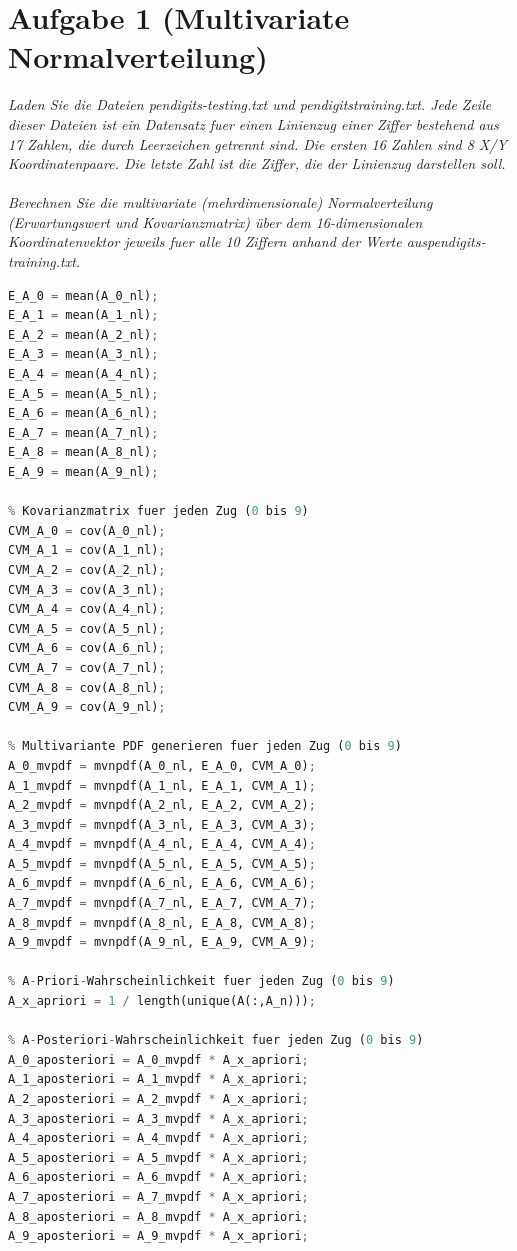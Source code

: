 \documentclass[12pt]{article}
\begin{document}
\section{Aufgabe 1 (Multivariate Normalverteilung)}
\textit{Laden Sie die Dateien pendigits-­testing.txt​ und pendigits­training.txt​. Jede Zeile dieser Dateien ist ein Datensatz fuer einen Linienzug einer Ziffer bestehend aus 17 Zahlen, die durch Leerzeichen getrennt sind. Die ersten 16 Zahlen sind 8 X/Y ­Koordinatenpaare. Die letzte Zahl ist die Ziffer, die der Linienzug darstellen soll.\\
\\
Berechnen Sie die multivariate (mehrdimensionale) Normalverteilung​ (Erwartungswert und Kovarianzmatrix) über dem 16­-dimensionalen Koordinatenvektor jeweils fuer alle 10 Ziffern anhand der Werte aus ​pendigits­training.txt​.}
\begin{lstlisting}[language=Python]
% Erwartungswert fuer jede Koordinate fuer jeden Zug (0 bis 9)
E_A_0 = mean(A_0_nl);
E_A_1 = mean(A_1_nl);
E_A_2 = mean(A_2_nl);
E_A_3 = mean(A_3_nl);
E_A_4 = mean(A_4_nl);
E_A_5 = mean(A_5_nl);
E_A_6 = mean(A_6_nl);
E_A_7 = mean(A_7_nl);
E_A_8 = mean(A_8_nl);
E_A_9 = mean(A_9_nl);

% Kovarianzmatrix fuer jeden Zug (0 bis 9)
CVM_A_0 = cov(A_0_nl);
CVM_A_1 = cov(A_1_nl);
CVM_A_2 = cov(A_2_nl);
CVM_A_3 = cov(A_3_nl);
CVM_A_4 = cov(A_4_nl);
CVM_A_5 = cov(A_5_nl);
CVM_A_6 = cov(A_6_nl);
CVM_A_7 = cov(A_7_nl);
CVM_A_8 = cov(A_8_nl);
CVM_A_9 = cov(A_9_nl);

% Multivariante PDF generieren fuer jeden Zug (0 bis 9)
A_0_mvpdf = mvnpdf(A_0_nl, E_A_0, CVM_A_0);
A_1_mvpdf = mvnpdf(A_1_nl, E_A_1, CVM_A_1);
A_2_mvpdf = mvnpdf(A_2_nl, E_A_2, CVM_A_2);
A_3_mvpdf = mvnpdf(A_3_nl, E_A_3, CVM_A_3);
A_4_mvpdf = mvnpdf(A_4_nl, E_A_4, CVM_A_4);
A_5_mvpdf = mvnpdf(A_5_nl, E_A_5, CVM_A_5);
A_6_mvpdf = mvnpdf(A_6_nl, E_A_6, CVM_A_6);
A_7_mvpdf = mvnpdf(A_7_nl, E_A_7, CVM_A_7);
A_8_mvpdf = mvnpdf(A_8_nl, E_A_8, CVM_A_8);
A_9_mvpdf = mvnpdf(A_9_nl, E_A_9, CVM_A_9);

% A-Priori-Wahrscheinlichkeit fuer jeden Zug (0 bis 9)
A_x_apriori = 1 / length(unique(A(:,A_n)));

% A-Posteriori-Wahrscheinlichkeit fuer jeden Zug (0 bis 9)
A_0_aposteriori = A_0_mvpdf * A_x_apriori;
A_1_aposteriori = A_1_mvpdf * A_x_apriori;
A_2_aposteriori = A_2_mvpdf * A_x_apriori;
A_3_aposteriori = A_3_mvpdf * A_x_apriori;
A_4_aposteriori = A_4_mvpdf * A_x_apriori;
A_5_aposteriori = A_5_mvpdf * A_x_apriori;
A_6_aposteriori = A_6_mvpdf * A_x_apriori;
A_7_aposteriori = A_7_mvpdf * A_x_apriori;
A_8_aposteriori = A_8_mvpdf * A_x_apriori;
A_9_aposteriori = A_9_mvpdf * A_x_apriori;
\end{lstlisting}
\end{document}
